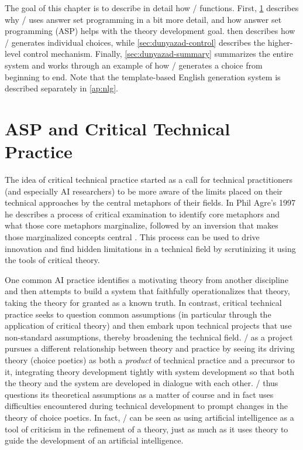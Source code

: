 The goal of this chapter is to describe in detail how \dunyazad/ functions.
%
First, \cref{sec:dunyazad-asp-and-ctp} describes why \dunyazad/ uses answer set programming in a bit more detail, and how answer set programming (ASP) helps with the theory development goal.
%
 then describes how \dunyazad/ generates individual choices, while \cref{sec:dunyazad-control} describes the higher-level control mechanism.
%
Finally, \cref{sec:dunyazad-summary} summarizes the entire system and works through an example of how \dunyazad/ generates a choice from beginning to end.
%
Note that the template-based English generation system is described separately in \cref{ap:nlg}.


\section{ASP and Critical Technical Practice}
\label{sec:dunyazad-asp-and-ctp}%

The idea of critical technical practice started as a call for technical practitioners (and especially AI researchers) to be more aware of the limits placed on their technical approaches by the central metaphors of their fields.
%
In Phil Agre's 1997  he describes a process of critical examination to identify core metaphors and what those core metaphors marginalize, followed by an inversion that makes those marginalized concepts central \citep{Agre1997}.
%
This process can be used to drive innovation and find hidden limitations in a technical field by scrutinizing it using the tools of critical theory.


One common AI practice identifies a motivating theory from another discipline and then attempts to build a system that faithfully operationalizes that theory, taking the theory for granted as a known truth.
%
In contrast, critical technical practice seeks to question common assumptions (in particular through the application of critical theory) and then embark upon technical projects that use non-standard assumptions, thereby broadening the technical field.
%
\dunyazad/ as a project pursues a different relationship between theory and practice by seeing its driving theory (choice poetics) as both a \emph{product} of technical practice and a precursor to it, integrating theory development tightly with system development so that both the theory and the system are developed in dialogue with each other.
%
\dunyazad/ thus questions its theoretical assumptions as a matter of course and in fact uses difficulties encountered during technical development to prompt changes in the theory of choice poetics.
%
In fact, \dunyazad/ can be seen as using artificial intelligence as a tool of criticism in the refinement of a theory, just as much as it uses theory to guide the development of an artificial intelligence.



